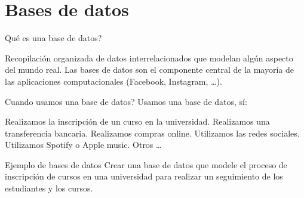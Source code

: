 \documentclass{beamer}
\begin{document}
  \section{Bases de datos}
 
 
 
 \begin{frame}{Qué es una base de datos?}
\begin{outline}
\1 Recopilación organizada de datos interrelacionados que
modelan algún aspecto del mundo real.
\1 Las bases de datos son el componente central de la mayoría
de las aplicaciones computacionales (Facebook, Instagram, \dots).
\end{outline}
 \end{frame}


 \begin{frame}{Cuando usamos una base de datos?}
 Usamos una base de datos, sí:
 \begin{outline}
 \1 Realizamos la inscripción de un curso en la universidad.
 \1 Realizamos una transferencia bancaria.
 \1 Realizamos compras online.
 \1 Utilizamos las redes sociales.
 \1 Utilizamos Spotify o Apple music.
 \1 Otros \dots
 \end{outline}
 \end{frame}
 
 \begin{frame}{Ejemplo de bases de datos}
 Crear una base de datos que modele el proceso de inscripción de cursos en una universidad
para realizar un seguimiento de los estudiantes y los cursos.

 \end{frame}
 
\end{document}
